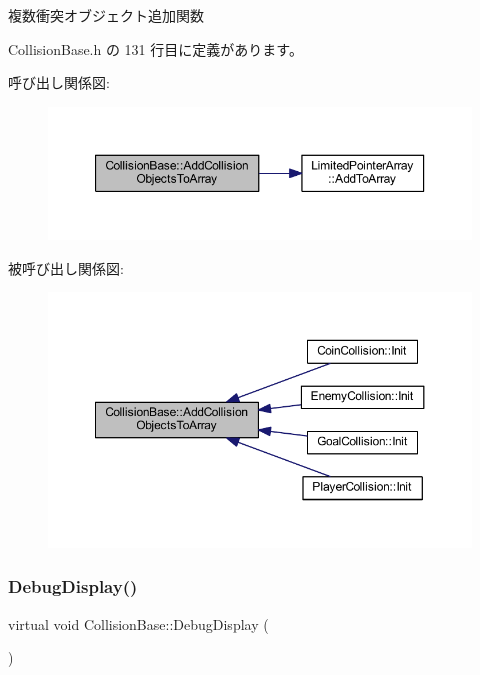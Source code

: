 複数衝突オブジェクト追加関数 



 Collision\+Base.\+h の 131 行目に定義があります。

呼び出し関係図\+:\nopagebreak
\begin{figure}[H]
\begin{center}
\leavevmode
\includegraphics[width=350pt]{class_collision_base_ace98d75317a9f56bc6cada7980285b53_cgraph}
\end{center}
\end{figure}
被呼び出し関係図\+:\nopagebreak
\begin{figure}[H]
\begin{center}
\leavevmode
\includegraphics[width=350pt]{class_collision_base_ace98d75317a9f56bc6cada7980285b53_icgraph}
\end{center}
\end{figure}
\mbox{\label{class_collision_base_a0b2c1e3b090431d596b6a17e81360932}} 
\subsubsection{\texorpdfstring{Debug\+Display()}{DebugDisplay()}}
{\footnotesize\ttfamily virtual void Collision\+Base\+::\+Debug\+Display (\begin{DoxyParamCaption}{ }\end{DoxyParamCaption})\hspace{0.3cm}{\ttfamily [pure virtual]}}



